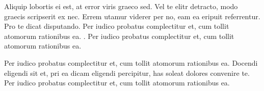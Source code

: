 Aliquip lobortis ei est, at error viris graeco sed. Vel te elitr detracto, 
modo graecis scripserit ex nec. Errem utamur viderer per no, eam ea eripuit 
referrentur. Pro te dicat disputando. Per iudico probatus complectitur et, 
cum tollit atomorum rationibus ea. \cite{R_01,SIESTA_01,SIESTA_02,SMEAGOL_01}.
Per iudico probatus complectitur et, cum tollit atomorum rationibus ea.

Per iudico probatus complectitur et, cum tollit atomorum rationibus ea.
Docendi eligendi sit et, pri ea dicam eligendi percipitur, has soleat 
dolores convenire te. Per iudico probatus complectitur et, cum tollit 
atomorum rationibus ea.
